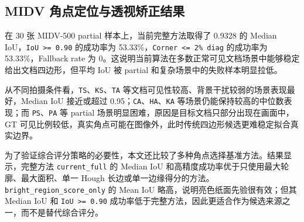 \documentclass[letterpaper]{article}
\newenvironment{coursewidetable}[2][!tbp]{%
\begin{table}[#1]
\centering
\small
\caption{#2}
\vspace{0.25em}
}{%
\end{table}
}
\begin{document}
\subsection{MIDV 角点定位与透视矫正结果}

在 30 张 MIDV-500 partial 样本上，当前完整方法取得了 0.9328 的 Median IoU，\texttt{IoU >= 0.90} 的成功率为 53.33\%，\texttt{Corner <= 2\% diag} 的成功率为 53.33\%，Fallback rate 为 0。这说明当前算法在多数正常可见文档场景中能够稳定给出文档四边形，但平均 IoU 被 partial 和复杂场景中的失败样本明显拉低。

从不同拍摄条件看，\texttt{TS}、\texttt{KS}、\texttt{TA} 等文档可见性较高、背景干扰较弱的场景表现最好，Median IoU 接近或超过 0.95；\texttt{CA}、\texttt{HA}、\texttt{KA} 等场景仍能保持较高的中位数表现；而 \texttt{PS}、\texttt{PA} 等 partial 场景明显困难，原因是目标文档只部分出现在画面中，GT 可见比例较低，真实角点可能在图像外，此时传统四边形候选更难稳定拟合真实边界。

为了验证综合评分策略的必要性，本文还比较了多种角点选择基准方法。结果显示，完整方法 \texttt{current\_full} 的 Median IoU 和高精度成功率优于只使用最大轮廓、最大面积、单一 Hough 长边或单一边缘得分的方法。\texttt{bright\_region\_score\_only} 的 Mean IoU 略高，说明亮色纸面先验很有效；但其 Median IoU 和 \texttt{IoU >= 0.90} 成功率低于完整方法，因此更适合作为候选来源之一，而不是替代综合评分。

\begin{coursewidetable}{角点候选选择策略消融对比}
\small
{}
\end{coursewidetable}
\end{document}
